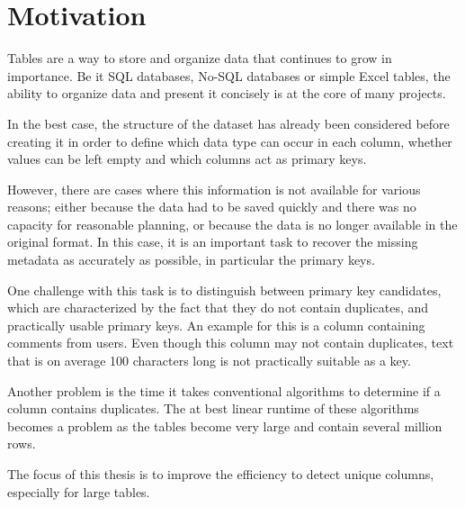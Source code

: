 \chapter{Motivation}
Tables are a way to store and organize data that continues to grow in importance. Be it SQL databases, No-SQL databases or simple Excel tables, the ability to organize data and present it concisely is at the core of many projects.

In the best case, the structure of the dataset has already been considered before creating it in order to define which data type can occur in each column, whether values can be left empty and which columns act as primary keys.

However, there are cases where this information is not available for various reasons; either because the data had to be saved quickly and there was no capacity for reasonable planning, or because the data is no longer available in the original format.
In this case, it is an important task to recover the missing metadata as accurately as possible, in particular the primary keys.

One challenge with this task is to distinguish between primary key candidates, which are characterized by the fact that they do not contain duplicates, and practically usable primary keys. An example for this is a column containing comments from users. Even though this column may not contain duplicates, text that is on average 100 characters long is not practically suitable as a key.

Another problem is the time it takes conventional algorithms to determine if a column contains duplicates. The at best linear runtime of these algorithms becomes a problem as the tables become very large and contain several million rows.

The focus of this thesis is to improve the efficiency to detect unique columns, especially for large tables.
